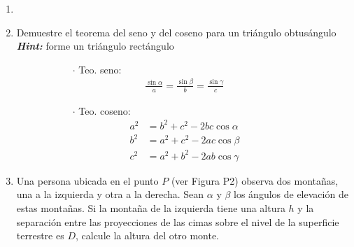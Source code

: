 \documentclass[letterpaper,11pt]{article}
\begin{document}
\vspace{-1.5cm}
\begin{enumerate}\setlength{\itemsep}{0.4cm}


\item[]

\item Demuestre el teorema del seno y del coseno para un triángulo obtusángulo\\
\textbf{\textit{Hint:}} forme un triángulo rectángulo

\begin{figure}[H]
    \centering
    \begin{subfigure}[t]{0.6\textwidth}
        \centering
        
    \end{subfigure}
    \hspace{1em}
    \begin{subfigure}[b]{0.30\textwidth}
        $\cdot$ Teo. seno:
        \begin{align*}
            \frac{\sin{\alpha}}{a}=\frac{\sin{\beta}}{b}=\frac{\sin{\gamma}}{c}
        \end{align*}
        
        $\cdot$ Teo. coseno:
        \begin{align*}
            a^2 &= b^2 + c^2 -2bc\cos{\alpha}\\
            b^2 &= a^2 + c^2 -2ac\cos{\beta}\\
            c^2 &= a^2 + b^2 -2ab\cos{\gamma}
        \end{align*}
    \end{subfigure}
\end{figure}

\item Una persona ubicada en el punto $P$ (ver Figura P2) observa dos montañas, una a la izquierda y otra a la derecha. Sean $\alpha$ y $\beta$ los ángulos de elevación de estas montañas. Si la montaña de la izquierda tiene una altura $h$ y la separación entre las proyecciones de las cimas sobre el nivel de la superficie terrestre es $D$, calcule la altura del otro monte. 



\end{enumerate}
\end{document}
